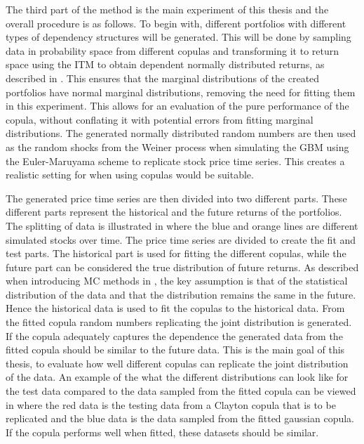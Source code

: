 The third part of the method is the main experiment of this thesis and the overall procedure is as follows.  To begin with, different portfolios with different types of dependency structures will be generated. This will be done by sampling data in probability space from different copulas and transforming it to return space using the \gls{ITM} to obtain dependent normally distributed returns, as described in . This ensures that the marginal distributions of the created portfolios have normal marginal distributions, removing the need for fitting them in this experiment. This allows for an evaluation of the pure performance of the copula, without conflating it with potential errors from fitting marginal distributions. The generated normally distributed random numbers are then used as the random shocks from the Weiner process when simulating the \gls{GBM} using the Euler-Maruyama scheme to replicate stock price time series. This creates a realistic setting for when using copulas would be suitable.  

The generated price time series are then divided into two different parts. These different parts represent the historical and the future returns of the portfolios. The splitting of data is illustrated in  where the blue and orange lines are different simulated stocks over time. The price time series are divided to create the fit and test parts. The historical part is used for fitting the different copulas, while the future part can be considered the true distribution of future returns. As described when introducing \gls{MC} methods in , the key assumption is that of the statistical distribution of the data and that the distribution remains the same in the future. Hence the historical data is used to fit the copulas to the historical data. From the fitted copula random numbers replicating the joint distribution is generated. If the copula adequately captures the dependence the generated data from the fitted copula should be similar to the future data. This is the main goal of this thesis, to evaluate how well different copulas can replicate the joint distribution of the data. An example of the what the different distributions can look like for the test data compared to the data sampled from the fitted copula can be viewed in  where the red data is the testing data from a Clayton copula that is to be replicated and the blue data is the data sampled from the fitted gaussian copula. If the copula performs well when fitted, these datasets should be similar. 

